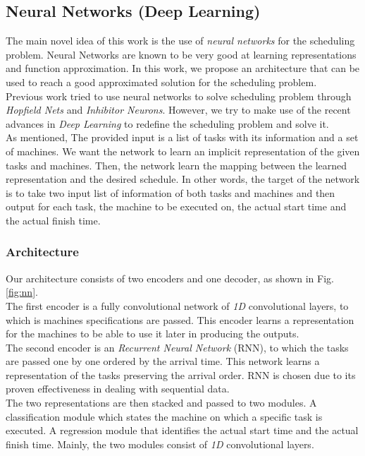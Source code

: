 \documentclass[twocolumn,11pt]{IEEEtran}
\begin{document}
\subsection{Neural Networks (Deep Learning)}
The main novel idea of this work is the use of \emph{neural networks} for the scheduling problem. Neural Networks are known to be very good at learning representations and function approximation. In this work, we propose an architecture that can be used to reach a good approximated solution for the scheduling problem. \\
Previous work tried to use neural networks to solve scheduling problem through \emph{Hopfield Nets} and \emph{Inhibitor Neurons}\cite{article3}. However, we try to make use of the recent advances in \emph{Deep Learning} to redefine the scheduling problem and solve it. \\
As mentioned, The provided input is a list of tasks with its information and a set of machines. We want the network to learn an implicit representation of the given tasks and machines. Then, the network learn the mapping between the learned representation and the desired schedule. In other words, the target of the network is to take two input list of information of both tasks and machines and then output for each task, the machine to be executed on, the actual start time and the actual finish time.
    
\subsubsection{Architecture}
Our architecture consists of two encoders and one decoder, as shown in Fig.\ref{fig:nn}. \\
The first encoder is a fully convolutional network of \emph{1D} convolutional layers, to which is machines specifications are passed. This encoder learns a representation for the machines to be able to use it later in producing the outputs. \\
The second encoder is an \emph{Recurrent Neural Network} (RNN)\cite{chung2014empirical}, to which the tasks are passed one by one ordered by the arrival time. This network learns a representation of the tasks preserving the arrival order. RNN is chosen due to its proven effectiveness in dealing with sequential data. \\
The two representations are then stacked and passed to two modules. A classification module which states the machine on which a specific task is executed. A regression module that identifies the actual start time and the actual finish time. Mainly, the two modules consist of \emph{1D} convolutional layers.
    
\end{document}

